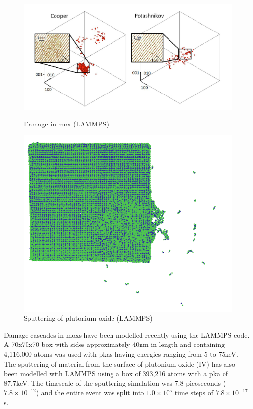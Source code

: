 \FloatBarrier
\begin{figure}[!htb]
\includegraphics[width=\linewidth]{chapters/interatomic_potential_fitting/images/puo2damage.png}
\caption{Damage in \acrshort{mox} (LAMMPS)\cite{moxlammpsdamage}}
\label{fig:feeosplot1}
\endminipage\hfill
{}
\includegraphics[width=\linewidth]{chapters/interatomic_potential_fitting/images/puo-sputtering.png}
\caption{Sputtering of plutonium oxide (LAMMPS)\cite{pusputtering}}
\label{fig:feecplot1}
\endminipage
\end{figure}
\FloatBarrier

Damage cascades in \acrlong{mox}s have been modelled recently using the LAMMPS code.  A 70x70x70 box with sides approximately 40nm in length and containing 4,116,000 atoms was used with \acrshort{pka}s having energies ranging from 5 to 75keV\cite{moxlammpsdamage}.  The sputtering of material from the surface of plutonium oxide (IV) has also been modelled with LAMMPS using a box of 393,216 atoms with a \acrshort{pka} of 87.7keV.  The timescale of the sputtering simulation was 7.8 picoseconds ($7.8 \times 10^{-12}$) and the entire event was split into $1.0 \times 10^{5}$ time steps of $7.8 \times 10^{-17}$s.

